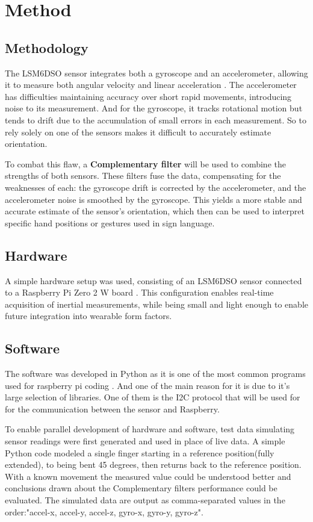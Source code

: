 \section{Method}
\label{section:method}
\subsection{Methodology}
The LSM6DSO sensor integrates both a gyroscope and an accelerometer, allowing it to measure both angular velocity and linear acceleration \cite{sensor}. The accelerometer has difficulties maintaining accuracy over short rapid movements, introducing noise to its measurement. And for the gyroscope, it tracks rotational motion but tends to drift due to the accumulation of small errors in each measurement. So to rely solely on one of the sensors makes it difficult to accurately estimate orientation.

To combat this flaw, a \textbf{Complementary filter} will be used to combine the strengths of both sensors\cite{Complementary}. These filters fuse the data, compensating for the weaknesses of each: the gyroscope drift is corrected by the accelerometer, and the accelerometer noise is smoothed by the gyroscope. This yields a more stable and accurate estimate of the sensor's orientation, which then can be used to interpret specific hand positions or gestures used in sign language.

\subsection{Hardware}
A simple hardware setup was used, consisting of an LSM6DSO sensor connected to a Raspberry Pi Zero 2 W board \cite{Rasp}. This configuration enables real-time acquisition of inertial measurements, while being small and light enough to enable future integration into wearable form factors. 

\subsection{Software}
The software was developed in Python as it is one of the most common programs used for raspberry pi coding \cite{Rasp_python}. And one of the main reason for it is due to it's large selection of libraries. One of them is the I2C protocol that will be used for for the communication between the sensor and Raspberry.

To enable parallel development of hardware and software, test data simulating sensor readings were first generated and used in place of live data. A simple Python code modeled a single finger starting in a reference position(fully extended), to being bent 45 degrees, then returns back to the reference position. With a known movement the measured value could be understood better and conclusions drawn about the Complementary filters performance could be evaluated. The simulated data are output as comma-separated values in the order:"accel-x, accel-y, accel-z, gyro-x, gyro-y, gyro-z".

